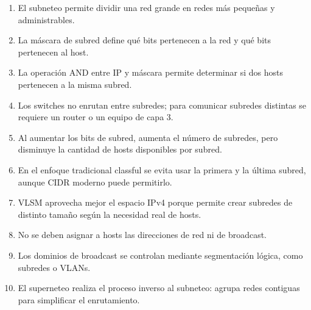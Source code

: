 \documentclass[a4paper,12pt]{article}
\begin{document}
\begin{enumerate}
    \item El subneteo permite dividir una red grande en redes más pequeñas y administrables.
    \item La máscara de subred define qué bits pertenecen a la red y qué bits pertenecen al host.
    \item La operación AND entre IP y máscara permite determinar si dos hosts pertenecen a la misma subred.
    \item Los switches no enrutan entre subredes; para comunicar subredes distintas se requiere un router o un equipo de capa 3.
    \item Al aumentar los bits de subred, aumenta el número de subredes, pero disminuye la cantidad de hosts disponibles por subred.
    \item En el enfoque tradicional classful se evita usar la primera y la última subred, aunque CIDR moderno puede permitirlo.
    \item VLSM aprovecha mejor el espacio IPv4 porque permite crear subredes de distinto tamaño según la necesidad real de hosts.
    \item No se deben asignar a hosts las direcciones de red ni de broadcast.
    \item Los dominios de broadcast se controlan mediante segmentación lógica, como subredes o VLANs.
    \item El superneteo realiza el proceso inverso al subneteo: agrupa redes contiguas para simplificar el enrutamiento.
\end{enumerate}
\end{document}
